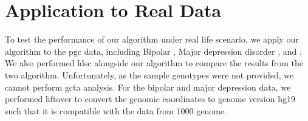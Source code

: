 	
	\section{Application to Real Data}
	To test the performance of our algorithm under real life scenario, we apply our algorithm to the \gls{pgc} data, including Bipolar \citep{PsychiatricGWASConsortiumBipolarDisorderWorkingGroup2011}, Major depression disorder \citep{Ripke2013b}, and  \citep{Ripke2014}.
	We also performed \gls{ldsc} alongside our algorithm to compare the results from the two algorithm.
	Unfortunately, as the sample genotypes were not provided, we cannot perform \gls{gcta} analysis.
	For the bipolar and major depression data, we performed liftover \citep{Hinrichs2006} to convert the genomic coordinates to genome version hg19 such that it is compatible with the data from 1000 genome.
	
